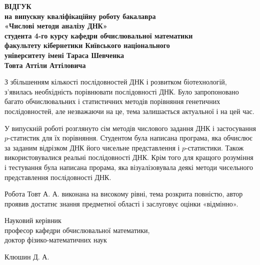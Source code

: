 \documentclass[14pt,a4paper,titlepage]{extarticle}
\begin{document}
\begin{center}
\textbf{ВІДГУК \\[0.7cm]
на випускну кваліфікаційну роботу бакалавра \\
«Числові методи аналізу ДНК» \\
студента 4-го курсу кафедри обчислювальної математики \\
факультету кібернетики Київського національного \\
університету імені Тараса Шевченка \\
Товта Аттіли Аттіловича
}
\end{center}
З збільшенням кількості послідовностей ДНК і розвитком біотехнологій,
з’явилась необхідність порівнювати послідовності ДНК. Було запропоновано
багато обчислювальних і статистичних методів порівняння генетичних послідовностей, але незважаючи на це, тема залишається актуальної і на цей час.
\par
У випускній роботі розглянуто сім методів числового задання ДНК і застосування $p$-статистик для їх порівняння. Студентом була написана програма, яка обчислює за заданим відрізком ДНК його чисельне представлення і $p$-статистики. Також використовувалися реальні послідовності ДНК. Крім того для кращого розуміння і тестування була написана прорама, яка візуалізовувала деякі методи чисельного представлення послідовності ДНК.
\par
Робота Товт А. А. виконана на високому рівні, тема розкрита повністю, автор проявив достатнє знання предметної області і заслуговує оцінки «відмінно».


\vfill

\begin{minipage}[t]{11cm}
\flushleft
Науковий керівник \\
професор кафедри обчислювальної математики,\\
доктор фізико-математичних наук
\end{minipage}
\begin{minipage}[t]{6cm}
\hfill
\flushright
Клюшин Д. А.
\end{minipage}
\end{document}
